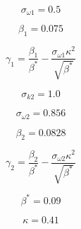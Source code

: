 {\newpage\clearpage
{}%
\begin{displaymath}
\sigma_{\omega 1} = 0.5
\end{displaymath}%
\lthtmldisplayZ
\lthtmlcheckvsize\clearpage}

{\newpage\clearpage
{}%
\begin{displaymath}
\beta_1 = 0.075
\end{displaymath}%
\lthtmldisplayZ
\lthtmlcheckvsize\clearpage}

{\newpage\clearpage
{}%
\begin{displaymath}
\gamma_1 = \frac{\beta_1}{\beta^*} - \frac{\sigma_{\omega 1} \kappa^2}{\sqrt{\beta^*}}
\end{displaymath}%
\lthtmldisplayZ
\lthtmlcheckvsize\clearpage}

{\newpage\clearpage
{}%
\begin{displaymath}
\sigma_{k 2} = 1.0
\end{displaymath}%
\lthtmldisplayZ
\lthtmlcheckvsize\clearpage}

{\newpage\clearpage
{}%
\begin{displaymath}
\sigma_{\omega 2} = 0.856
\end{displaymath}%
\lthtmldisplayZ
\lthtmlcheckvsize\clearpage}

{\newpage\clearpage
{}%
\begin{displaymath}
\beta_2 = 0.0828
\end{displaymath}%
\lthtmldisplayZ
\lthtmlcheckvsize\clearpage}

{\newpage\clearpage
{}%
\begin{displaymath}
\gamma_2 = \frac{\beta_2}{\beta^*} - \frac{\sigma_{\omega 2} \kappa^2}{\sqrt{\beta^*}}
\end{displaymath}%
\lthtmldisplayZ
\lthtmlcheckvsize\clearpage}

{\newpage\clearpage
{}%
\begin{displaymath}
\beta^*=0.09
\end{displaymath}%
\lthtmldisplayZ
\lthtmlcheckvsize\clearpage}

{\newpage\clearpage
{}%
\begin{displaymath}
\kappa=0.41
\end{displaymath}%
\lthtmldisplayZ
\lthtmlcheckvsize\clearpage}

